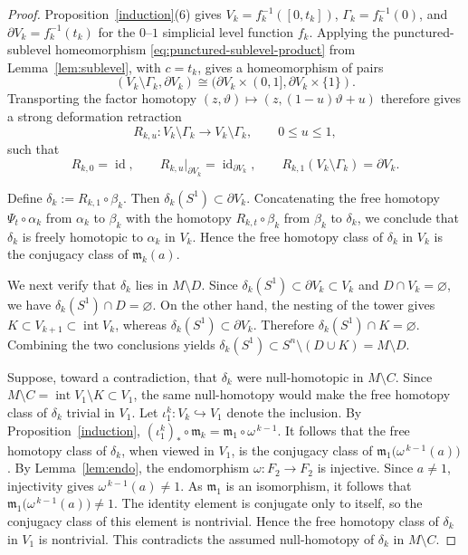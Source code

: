\documentclass[12pt,oneside,a4paper]{article}
\theoremstyle{mytheorem}
\theoremstyle{remark}
\theoremstyle{definition}
\begin{document}
\begin{proof}
Proposition~\ref{induction}(6) gives
$V_k=f_k^{-1}([0,t_k])$, $\Gamma_k=f_k^{-1}(0)$, and
$\partial V_k=f_k^{-1}(t_k)$ for the $0$--$1$ simplicial level function
$f_k$.  Applying the punctured-sublevel homeomorphism
\eqref{eq:punctured-sublevel-product} from Lemma~\ref{lem:sublevel}, with
$c=t_k$, gives a homeomorphism of pairs
\[
 (V_k\setminus\Gamma_k,\partial V_k)
 \cong
 (\partial V_k\times(0,1],\partial V_k\times\{1\}).
\]
Transporting the factor homotopy
$(z,\vartheta)\mapsto(z,(1-u)\vartheta+u)$ therefore gives a strong deformation
retraction
\[
R_{k,u}:V_k\setminus\Gamma_k
\longrightarrow
V_k\setminus\Gamma_k,
\qquad
0\leq u\leq1,
\]
such that
\[
R_{k,0}=\operatorname{id},
\qquad
R_{k,u}\big|_{\partial V_k}
=
\operatorname{id}_{\partial V_k},
\qquad
R_{k,1}(V_k\setminus\Gamma_k)=\partial V_k.
\]


Define $\delta_k:=R_{k,1}\circ\beta_k$.  Then
$\delta_k(S^1)\subset\partial V_k$.
Concatenating the free homotopy \(\Psi_t\circ\alpha_k\) from
\(\alpha_k\) to \(\beta_k\) with the homotopy
\(R_{k,t}\circ\beta_k\) from \(\beta_k\) to \(\delta_k\), we conclude
that \(\delta_k\) is freely homotopic to \(\alpha_k\) in \(V_k\).
Hence the free homotopy class of \(\delta_k\) in \(V_k\) is the
conjugacy class of $\mathfrak{m}_k(a)$.

We next verify that $\delta_k$ lies in $M\setminus D$.  Since
$\delta_k(S^1)\subset\partial V_k\subset V_k$
and \(D\cap V_k=\varnothing\), we have
$\delta_k(S^1)\cap D=\varnothing$.
On the other hand, the nesting of the tower gives
$K\subset V_{k+1}\subset\operatorname{int}V_k$, whereas
$\delta_k(S^1)\subset\partial V_k$.
Therefore $\delta_k(S^1)\cap K=\varnothing$.
Combining the two conclusions yields
$\delta_k(S^1)\subset S^n\setminus(D\cup K)=M\setminus D$.

Suppose, toward a contradiction, that $\delta_k$ were null-homotopic in
$M\setminus C$.  Since
$M\setminus C=\operatorname{int}V_1\setminus K\subset V_1$, the same null-homotopy
would make the free homotopy class of $\delta_k$ trivial in $V_1$.
Let $\iota_1^k:V_k\hookrightarrow V_1$ denote the inclusion.  By
Proposition~\ref{induction},
$(\iota_1^k)_*\circ\mathfrak{m}_k
=\mathfrak{m}_1\circ\omega^{\,k-1}.$
It follows that the free homotopy class of \(\delta_k\), when viewed
in \(V_1\), is the conjugacy class of
$\mathfrak{m}_1\bigl(\omega^{\,k-1}(a)\bigr)$.  By Lemma~\ref{lem:endo}, the
endomorphism $\omega:F_2\to F_2$ is injective.  Since $a\neq1$,
injectivity gives $\omega^{\,k-1}(a)\neq1$.
As $\mathfrak{m}_1$ is an isomorphism, it follows that
$\mathfrak{m}_1\bigl(\omega^{\,k-1}(a)\bigr)\neq1$.
The identity element is conjugate only to itself, so the conjugacy
class of this element is nontrivial.  Hence the free homotopy class of
$\delta_k$ in $V_1$ is nontrivial.  This contradicts the assumed
null-homotopy of \(\delta_k\) in \(M\setminus C\).


\end{proof}
\end{document}
